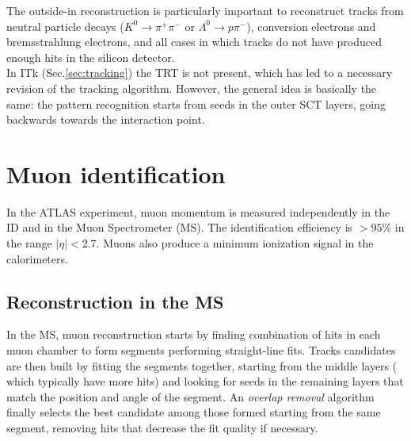 \documentclass[a4paper,twoside,12pt]{book}
\begin{document}
The outside-in reconstruction is particularly important to reconstruct tracks from neutral particle decays ($K^0 \rightarrow \pi^+\pi^-$ or $\Lambda^0 \rightarrow p\pi^-$), conversion
electrons and bremsstrahlung electrons, and all cases in which tracks do not have
produced enough hits in the silicon detector. \\

In ITk (Sec.\ref{sec:tracking}) the TRT is not present, which has led to a necessary revision of the tracking algorithm. However, the general idea is basically the same:
the pattern recognition starts from seeds in the outer SCT layers, going backwards towards the interaction point\cite{Claudia}.

\section{Muon identification}
In the ATLAS experiment, muon momentum is measured independently in the ID and in the
Muon Spectrometer (MS). The identification efficiency is \mbox{$> 95\%$\cite{PhysicsObjectReconstruction}} in the
range $|\eta| < 2.7$. Muons also produce a minimum ionization signal in the calorimeters.\\

\subsection*{Reconstruction in the MS}
In the MS, muon reconstruction starts by finding combination of hits in each muon chamber
to form segments performing straight-line fits. Tracks candidates are then built by fitting the
segments together\cite{muonReconstruction}, starting from the middle layers (
which typically have more hits) and looking for seeds in the remaining layers that match
the position and angle of the segment. An \textit{overlap removal} algorithm finally
selects the best candidate among those formed starting from the same segment, 
removing hits that decrease the fit quality if necessary.
\end{document}
